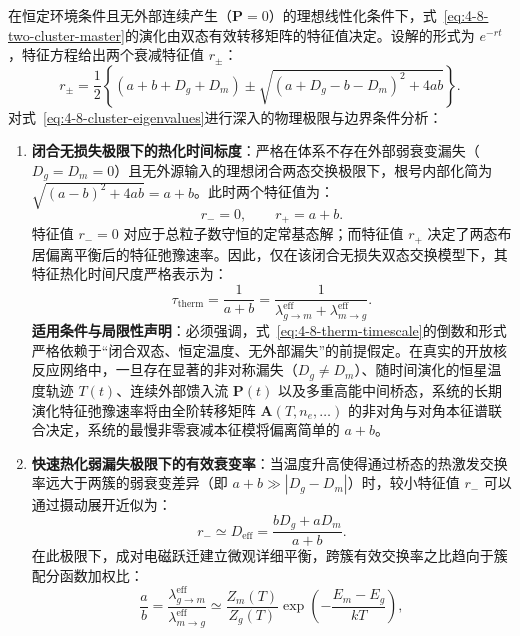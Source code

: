 在恒定环境条件且无外部连续产生（$\mathbf{P} = 0$）的理想线性化条件下，式~\eqref{eq:4-8-two-cluster-master}的演化由双态有效转移矩阵的特征值决定。设解的形式为 $e^{-r t}$，特征方程给出两个衰减特征值 $r_\pm$：
\begin{equation}\label{eq:4-8-cluster-eigenvalues}
r_\pm = \frac{1}{2}\left\{ (a + b + D_g + D_m) \pm \sqrt{(a + D_g - b - D_m)^2 + 4ab} \right\}.
\end{equation}
对式~\eqref{eq:4-8-cluster-eigenvalues}进行深入的物理极限与边界条件分析：
\begin{enumerate}
\item \textbf{闭合无损失极限下的热化时间标度}：严格在体系不存在外部弱衰变漏失（$D_g = D_m = 0$）且无外源输入的理想闭合两态交换极限下，根号内部化简为 $\sqrt{(a-b)^2 + 4ab} = a+b$。此时两个特征值为：
\begin{equation}\label{eq:4-8-lossless-limits}
r_- = 0, \qquad r_+ = a + b.
\end{equation}
特征值 $r_- = 0$ 对应于总粒子数守恒的定常基态解；而特征值 $r_+$ 决定了两态布居偏离平衡后的特征弛豫速率。因此，仅在该闭合无损失双态交换模型下，其特征热化时间尺度严格表示为：
\begin{equation}\label{eq:4-8-therm-timescale}
\tau_{\mathrm{therm}} = \frac{1}{a + b} = \frac{1}{\lambda_{g \to m}^{\mathrm{eff}} + \lambda_{m \to g}^{\mathrm{eff}}}.
\end{equation}
\textbf{适用条件与局限性声明}：必须强调，式~\eqref{eq:4-8-therm-timescale}的倒数和形式严格依赖于“闭合双态、恒定温度、无外部漏失”的前提假定。在真实的开放核反应网络中，一旦存在显著的非对称漏失（$D_g \ne D_m$）、随时间演化的恒星温度轨迹 $T(t)$、连续外部馈入流 $\mathbf{P}(t)$ 以及多重高能中间桥态，系统的长期演化特征弛豫速率将由全阶转移矩阵 $\mathbf{A}(T, n_e, \dots)$ 的非对角与对角本征谱联合决定，系统的最慢非零衰减本征模将偏离简单的 $a+b$。
\item \textbf{快速热化弱漏失极限下的有效衰变率}：当温度升高使得通过桥态的热激发交换率远大于两簇的弱衰变差异（即 $a + b \gg |D_g - D_m|$）时，较小特征值 $r_-$ 可以通过摄动展开近似为：
\begin{equation}\label{eq:4-8-effective-decay-approx}
r_- \simeq D_{\mathrm{eff}} = \frac{b D_g + a D_m}{a + b}.
\end{equation}
在此极限下，成对电磁跃迁建立微观详细平衡，跨簇有效交换率之比趋向于簇配分函数加权比：
\begin{equation}\label{eq:4-8-partition-ratio}
\frac{a}{b} = \frac{\lambda_{g \to m}^{\mathrm{eff}}}{\lambda_{m \to g}^{\mathrm{eff}}} \simeq \frac{Z_m(T)}{Z_g(T)} \exp\left(-\frac{E_m - E_g}{kT}\right),

\end{equation}
\end{enumerate}
